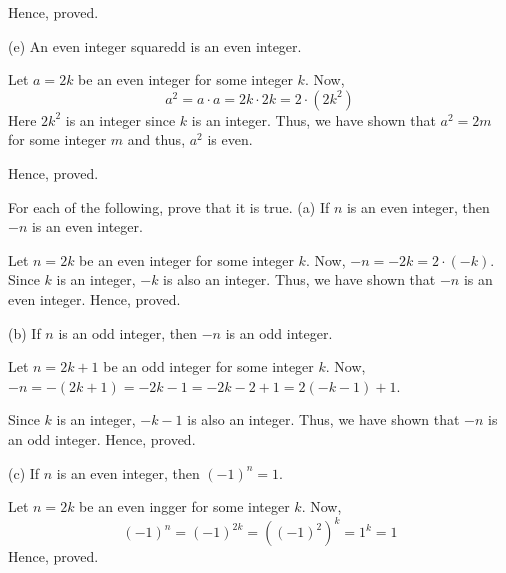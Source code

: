 \begin{problem}
\begin{solution}
		Hence, proved.
	\end{solution}
	
	(e) An even integer squaredd is an even integer.
	\begin{solution}
		Let $a = 2k$ be an even integer for some integer $k$. Now,
		$$a^2 = a \cdot a = 2k \cdot 2k = 2 \cdot (2k^2)$$
		Here $2k^2$ is an integer since $k$ is an integer. Thus, we have shown that $a^2 = 2m$ for some integer $m$ and thus, $a^2$ is even.

		Hence, proved.
	\end{solution}

\end{problem}


\begin{problem}
	For each of the following, prove that it is true.
	\bigbreak
	(a) If $n$ is an even integer, then $-n$ is an even integer.
	\begin{solution}
		Let $n = 2k$ be an even integer for some integer $k$. Now, $-n = -2k = 2 \cdot (-k)$. Since $k$ is an integer, $-k$ is also an integer. Thus, we have shown that $-n$ is an even integer. Hence, proved.
	\end{solution}

	(b) If $n$ is an odd integer, then $-n$ is an odd integer.
	\begin{solution}
		Let $n = 2k+1$ be an odd integer for some integer $k$. Now, $-n = -(2k+1) =-2k-1 = -2k-2+1 = 2(-k-1) + 1$.

		Since $k$ is an integer, $-k-1$ is also an integer. Thus, we have shown that $-n$ is an odd integer. Hence, proved.
	\end{solution}

	(c) If $n$ is an even integer, then $(-1)^n = 1$.
	\begin{solution}
		Let $n = 2k$ be an even ingger for some integer $k$. Now, 
		$$(-1)^n = (-1)^{2k} = ((-1)^2)^k = 1^k = 1$$
		Hence, proved.
	\end{solution}
\end{problem}

